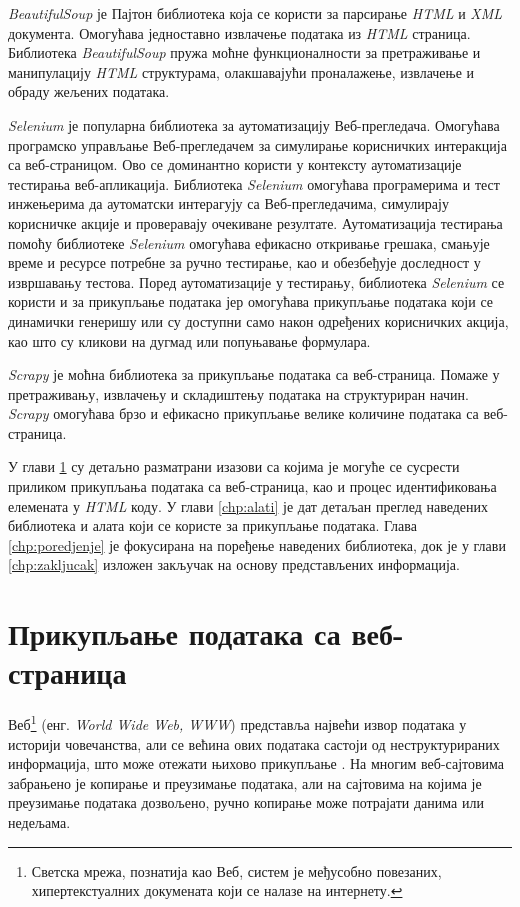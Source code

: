 \documentclass[12pt,oneside]{memoir}
\begin{document}
\textit{BeautifulSoup} је Пајтон библиотека која се користи за парсирање \textit{HTML} и \textit{XML} документа. Омогућава једноставно извлачење података из \textit{HTML} страница. Библиотека \textit{BeautifulSoup} пружа моћне функционалности за претраживање и манипулацију \textit{HTML} структурама, олакшавајући проналажење, извлачење и обраду жељених података.

\textit{Selenium} је популарна библиотека за аутоматизацију Веб-прегледача. Омогућава програмско управљање Веб-прегледачем за симулирање корисничких
интеракција са веб-страницом. Ово се доминантно користи у контексту аутоматизације тестирања веб-апликација. Библиотека \textit{Selenium} омогућава програмерима и тест инжењерима да аутоматски интерагују са Веб-прегледачима, симулирају корисничке акције и проверавају очекиване резултате. Аутоматизација тестирања помоћу библиотеке \textit{Selenium} омогућава ефикасно откривање грешака, смањује време и ресурсе потребне за ручно тестирање, као и обезбеђује доследност у извршавању тестова. Поред аутоматизације у тестирању, библиотека \textit{Selenium} се користи и за прикупљање података јер омогућава прикупљање података који се динамички генеришу или су доступни само након одређених корисничких акција, као што су кликови на дугмад или попуњавање формулара.

\textit{Scrapy} је моћна библиотека за прикупљање података са веб-страница. Помаже у претраживању, извлачењу и складиштењу података на структуриран начин. \textit{Scrapy} омогућава брзо и ефикасно прикупљање велике количине података са веб-страница. 

У глави \ref{chp:prikupljanje} су детаљно разматрани изазови са којима је могуће се сусрести приликом прикупљања података са веб-страница, као и процес идентификовања елемената у \textit{HTML} коду. У глави \ref{chp:alati} је дат детаљан преглед наведених библиотека и алата који се користе за прикупљање података. Глава \ref{chp:poredjenje} је фокусирана на поређење наведених библиотека, док је у глави \ref{chp:zakljucak} изложен закључак на основу представљених информација.

\chapter{Прикупљање података са веб-страница}
\label{chp:prikupljanje}
Веб\footnote{Светска мрежа, познатија као Веб, систем је међусобно повезаних, хипертекстуалних докумената који се налазе на интернету.} (енг. \textit{World Wide Web, WWW}) представља највећи извор података у историји човечанства, али се већина ових података састоји од неструктурираних информација, што може отежати њихово прикупљање \cite{osmarPaper}. 
На многим веб-сајтовима забрањено је копирање и преузимање података, али на сајтовима на којима је преузимање података дозвољено, ручно копирање може потрајати данима или недељама.
\end{document}
